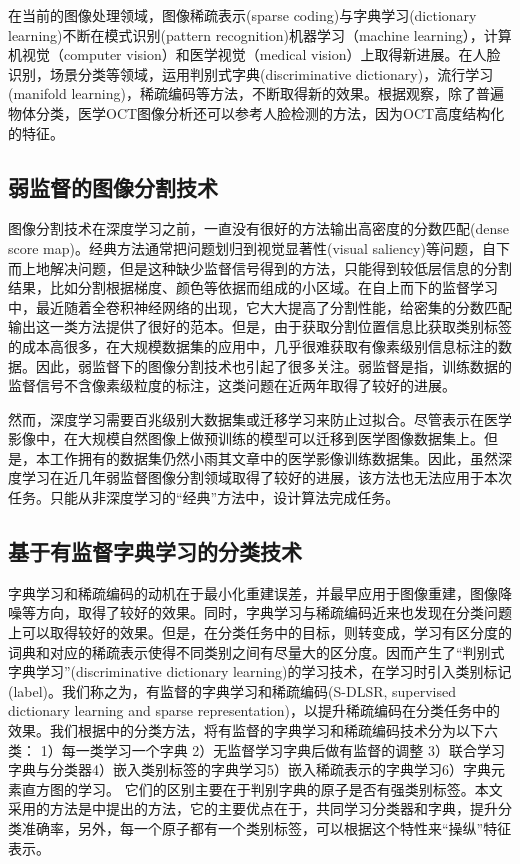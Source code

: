     在当前的图像处理领域，图像稀疏表示(sparse coding)与字典学习(dictionary learning)不断在模式识别(pattern recognition)机器学习（machine learning），计算机视觉（computer vision）和医学视觉（medical vision）上取得新进展。在人脸识别\cite{}，场景分类\cite{}等领域，运用判别式字典(discriminative dictionary)，流行学习(manifold learning)，稀疏编码等方法，不断取得新的效果。根据观察，除了普遍物体分类，医学OCT图像分析还可以参考人脸检测的方法，因为OCT高度结构化的特征。



    \subsection{弱监督的图像分割技术}
    图像分割技术在深度学习之前，一直没有很好的方法输出高密度的分数匹配(dense score map)。经典方法通常把问题划归到视觉显著性(visual saliency)\cite{hu}等问题，自下而上地解决问题，但是这种缺少监督信号得到的方法，只能得到较低层信息的分割结果，比如分割根据梯度、颜色等依据而组成的小区域。在自上而下的监督学习中，最近随着全卷积神经网络\cite{}的出现，它大大提高了分割性能，给密集的分数匹配输出这一类方法提供了很好的范本。但是，由于获取分割位置信息比获取类别标签的成本高很多，在大规模数据集的应用中，几乎很难获取有像素级别信息标注的数据。因此，弱监督下的图像分割技术也引起了很多关注。弱监督是指，训练数据的监督信号不含像素级粒度的标注，这类问题在近两年取得了较好的进展\cite{}。

    然而，深度学习需要百兆级别大数据集\cite{}或迁移学习\cite{}来防止过拟合。尽管\cite{}表示在医学影像中，在大规模自然图像上做预训练的模型可以迁移到医学图像数据集上。但是，本工作拥有的数据集仍然小雨其文章中的医学影像训练数据集。因此，虽然深度学习在近几年弱监督图像分割领域取得了较好的进展，该方法也无法应用于本次任务。只能从非深度学习的“经典”方法中，设计算法完成任务。





    \subsection{基于有监督字典学习的分类技术}
    字典学习和稀疏编码的动机在于最小化重建误差，并最早应用于图像重建，图像降噪等方向，取得了较好的效果。同时，字典学习与稀疏编码近来也发现在分类问题上可以取得较好的效果。但是，在分类任务中的目标，则转变成，学习有区分度的词典和对应的稀疏表示使得不同类别之间有尽量大的区分度。因而产生了“判别式字典学习”(discriminative dictionary learning)的学习技术，在学习时引入类别标记(label)。我们称之为，有监督的字典学习和稀疏编码(S-DLSR, supervised dictionary learning and sparse representation)，以提升稀疏编码在分类任务中的效果。我们根据\cite{}中的分类方法，将有监督的字典学习和稀疏编码技术分为以下六类： 1）每一类学习一个字典\cite{} 2）无监督学习字典后做有监督的调整\cite{} 3）联合学习字典与分类器\cite{}4）嵌入类别标签的字典学习5）嵌入稀疏表示的字典学习\cite{}6）字典元素直方图的学习。\cite{}
    它们的区别主要在于判别字典的原子是否有强类别标签。本文采用的方法是\cite{}中提出的方法，它的主要优点在于，共同学习分类器和字典，提升分类准确率，另外，每一个原子都有一个类别标签，可以根据这个特性来“操纵”特征表示。

